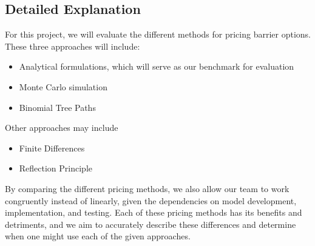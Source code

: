 \documentclass[16pt]{article}
\begin{document}
\subsection*{Detailed Explanation}
For this project, we will evaluate the different methods for pricing barrier options. These three approaches will include:
\begin{itemize}
	\item Analytical formulations, which will serve as our benchmark for evaluation
	\item Monte Carlo simulation
	\item Binomial Tree Paths
\end{itemize}
Other approaches may include
\begin{itemize}
	\item Finite Differences
	\item Reflection Principle
\end{itemize}
By comparing the different pricing methods, we also allow our team to work congruently instead of linearly, given the dependencies on model development, implementation, and testing. Each of these pricing methods has its benefits and detriments, and we aim to accurately describe these differences and determine when one might use each of the given approaches.
\end{document}
